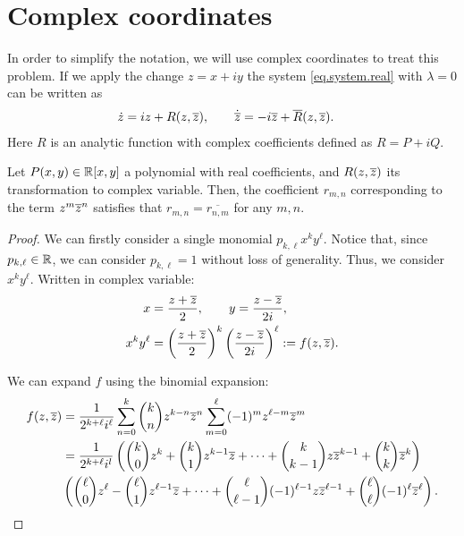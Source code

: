 \section{Complex coordinates}

In order to simplify the notation, we will use complex coordinates to treat this problem. If we apply the change $z=x+iy$ the system \eqref{eq.system.real} with $\lambda=0$ can be written as
\begin{align}
\dot z &= iz + R(z,{\overline{z}}),\qquad \dot {\overline{z}} = -i\overline{z} + \overline{R}(z,{\overline{z}}).
\label{eq.system.complex}
\end{align}
Here $R$ is an analytic function with complex coefficients defined as $R=P+iQ$.

\begin{lemma}
Let $P(x,y)\in\mathbb{R}[x,y]$ a polynomial with real coefficients, and $R(z,\overline{z})$ its transformation to complex variable. Then, the coefficient $r_{m,n}$ corresponding to the term $z^m\overline{z}^n$ satisfies that $r_{m,n}=\overline{r_{n,m}}$ for any $m,n$.

\begin{proof}
We can firstly consider a single monomial $p_{k,\ell}x^ky^\ell$. Notice that, since $p_{k,\ell}\in\mathbb{R}$, we can consider $p_{k,\ell}=1$ without loss of generality. Thus, we consider $x^ky^\ell$. Written in complex variable:
\begin{align}
x&=\frac{z+\overline{z}}{2}, \qquad y=\frac{z-\overline{z}}{2i},\\
x^ky^\ell &= \left(\frac{z+\overline{z}}{2}\right)^k\left(\frac{z-\overline{z}}{2i}\right)^\ell:= f(z,\overline{z}).
\end{align}

We can expand $f$ using the binomial expansion:
\begin{align*}
f(z,\overline{z})&=\frac{1}{2^{k+\ell}i^\ell}\sum_{n=0}^k\binom{k}{n}z^{k-n}\overline{z}^n \sum_{m=0}^\ell(-1)^mz^{\ell-m}\overline{z}^m\\
&=\frac{1}{2^{k+\ell}i^l}\left(\binom{k}{0}z^k+\binom{k}{1}z^{k-1}\overline{z}+\cdots+\binom{k}{k-1}z\overline{z}^{k-1}+\binom{k}{k}\overline{z}^k\right)\\
&{}\left(\binom{\ell}{0}z^\ell-\binom{\ell}{1}z^{\ell-1}\overline{z}+\cdots+\binom{\ell}{\ell-1}(-1)^{\ell-1}z\overline{z}^{\ell-1}+\binom{\ell}{\ell}(-1)^\ell\overline{z}^\ell\right).
\end{align*}


\end{proof}
\end{lemma}

